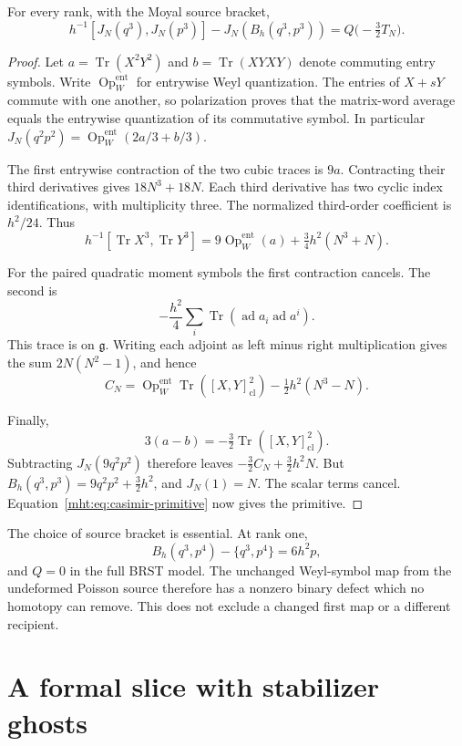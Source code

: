 \begin{proposition}\label{mht:prop:cubic-brst}
For every rank, with the Moyal source bracket,
\[
 h^{-1}[J_N(q^3),J_N(p^3)]-J_N(B_h(q^3,p^3))
       =Q\bigl(-\tfrac32T_N\bigr).
\]
\end{proposition}
\begin{proof}
Let $a=\operatorname{Tr}(X^2Y^2)$ and
$b=\operatorname{Tr}(XYXY)$ denote commuting entry symbols.
Write $\operatorname{Op}^{\mathrm{ent}}_W$ for entrywise
Weyl quantization. The entries of $X+sY$ commute with one
another, so polarization proves that the matrix-word average
equals the entrywise quantization of its commutative symbol.
In particular $J_N(q^2p^2)=
\operatorname{Op}^{\mathrm{ent}}_W(2a/3+b/3)$.

The first entrywise contraction of the two cubic traces is
$9a$. Contracting their third derivatives gives
$18N^3+18N$. Each third derivative has two cyclic index
identifications, with multiplicity three.
The normalized third-order coefficient is $h^2/24$.
Thus
\[
 h^{-1}[\operatorname{Tr}X^3,\operatorname{Tr}Y^3]
 =9\operatorname{Op}^{\mathrm{ent}}_W(a)
      +\tfrac34h^2(N^3+N).
\]

For the paired quadratic moment symbols the first contraction
cancels. The second is
\[
 -\frac{h^2}{4}\sum_i\operatorname{Tr}
              (\operatorname{ad}a_i\operatorname{ad}a^i).
\]
This trace is on $\mathfrak g$. Writing each adjoint as left
minus right multiplication gives the sum $2N(N^2-1)$, and hence
\[
 C_N=\operatorname{Op}^{\mathrm{ent}}_W
       \operatorname{Tr}([X,Y]_{\mathrm{cl}}^2)
             -\tfrac12h^2(N^3-N).
\]

Finally,
\[
 3(a-b)=-\tfrac32\operatorname{Tr}([X,Y]_{\mathrm{cl}}^2).
\]
Subtracting $J_N(9q^2p^2)$ therefore leaves
$-\frac32 C_N+\frac32h^2N$.
But $B_h(q^3,p^3)=9q^2p^2+\frac32h^2$, and $J_N(1)=N$.
The scalar terms cancel. Equation~\eqref{mht:eq:casimir-primitive}
now gives the primitive.
\end{proof}

The choice of source bracket is essential. At rank one,
\[
 B_h(q^3,p^4)-\{q^3,p^4\}=6h^2p,
\]
and $Q=0$ in the full BRST model. The unchanged Weyl-symbol
map from the undeformed Poisson source therefore has a nonzero
binary defect which no homotopy can remove. This does not
exclude a changed first map or a different recipient.

\section{A formal slice with stabilizer ghosts}


